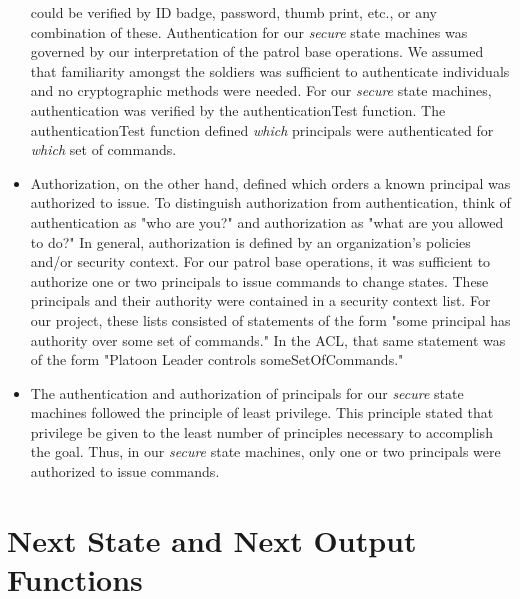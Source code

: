 \begin{itemize}
  could be verified by ID badge, password, thumb print, etc., or any combination of these.
  Authentication for our \textit{secure} state machines was governed by our interpretation
  of the patrol base operations.  We assumed that familiarity amongst the soldiers was
  sufficient to authenticate individuals and no cryptographic methods were needed.  For
  our \textit{secure} state machines, authentication was verified by the authenticationTest
  function. The authenticationTest function defined \textit{which} principals were
  authenticated for \textit{which} set of commands.
\item Authorization, on the other hand, defined which orders a known principal
  was authorized to issue.  To distinguish authorization from authentication,
  think of authentication as "who are you?" and authorization as "what are you
  allowed to do?"  In general, authorization is defined by an organization's policies
  and/or security context. For our patrol base operations, it was sufficient to
  authorize one or two principals to issue commands to change states.  These principals
  and their authority were contained in a security context list.  For our project,
  these lists consisted of statements of the form "some principal has authority
  over some set of commands."  In the ACL, that same statement was of the form
  "Platoon Leader controls someSetOfCommands." 
\item The authentication and authorization of principals for our \textit{secure}
  state machines followed the principle of least privilege.  This principle stated
  that privilege be given to the least number of principles necessary to accomplish
  the goal.   Thus, in our \textit{secure} state machines, only one or two principals
  were authorized to issue commands.  
\end{itemize}

\chapter{Next State and Next Output Functions}
\label{cha:next-state-next-1}

